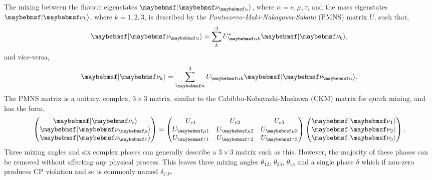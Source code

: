 The mixing between the flavour eigenstates $\ket{\nu_{\alpha}}$, where $\alpha=e,\mu,\tau$, and
the mass eigenstates $\ket{\nu_{k}}$, where $k=1,2,3$, is described by the
\emph{Pontecorvo-Maki-Nakagawa-Sakata} (PMNS) matrix $U$, such that,
\begin{equation} %
    \ket{\nu_{\alpha}}=\sum_{k}^{3}U_{\alpha k}^{*}\ket{\nu_{k}},
\end{equation}
and vice-versa,
\begin{equation} %
    \ket{\nu_{k}}=\sum_{\alpha}^{3}U_{\alpha k}\ket{\nu_{\alpha}}.
\end{equation}
The PMNS matrix is a unitary, complex, $3\times3$ matrix, similar to the Cabibbo-Kobayashi-Maskawa
(CKM) matrix for quark mixing, and has the form,
\begin{gather} %
    \begin{pmatrix}
        \ket{\nu_{e}}   \\
        \ket{\nu_{\mu}} \\
        \ket{\nu_{\tau}}
    \end{pmatrix}
    =
    \begin{pmatrix}
        U_{e1}     & U_{e2}     & U_{e3}     \\
        U_{\mu 1}  & U_{\mu 2}  & U_{\mu 3}  \\
        U_{\tau 1} & U_{\tau 2} & U_{\tau 3}
    \end{pmatrix}
    \begin{pmatrix}
        \ket{\nu_{1}} \\
        \ket{\nu_{2}} \\
        \ket{\nu_{3}}
    \end{pmatrix}.
\end{gather} %
Three mixing angles and six complex phases can generally describe a $3\times3$ matrix such as
this. However, the majority of these phases can be removed without affecting any physical process.
This leaves three mixing angles $\theta_{12}$, $\theta_{23}$, $\theta_{13}$ and a single phase
$\delta$ which if non-zero produces CP violation and so is commonly named $\delta_{CP}$.

